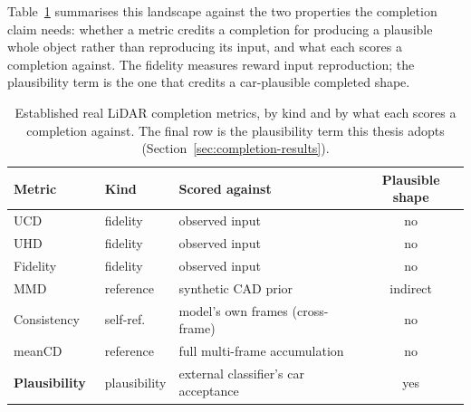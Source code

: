 \documentclass[a4paper,12pt]{report}
\begin{document}
Table~\ref{tab:completion-metrics} summarises this landscape against the two properties
the completion claim needs: whether a metric credits a completion for producing a
plausible whole object rather than reproducing its input, and what each scores a
completion against. The fidelity measures reward input reproduction; the plausibility
term is the one that credits a car-plausible completed shape.

\begin{table}[H]
  \centering
  \caption[Real LiDAR completion metrics by type]{Established real LiDAR completion
    metrics, by kind and by what each scores a completion against. The final row is the
    plausibility term this thesis adopts (Section~\ref{sec:completion-results}).}
  \label{tab:completion-metrics}
  \small
  \renewcommand{\arraystretch}{1.2}
  \setlength{\tabcolsep}{6pt}
  \begin{tabular}{@{}p{2.6cm}p{2.4cm}p{4.4cm}c@{}}
    \toprule
    Metric & Kind & Scored against & Plausible shape \\
    \midrule
    UCD~\cite{cui2023p2c}       & fidelity & observed input & no \\
    UHD~\cite{chen2020unpaired} & fidelity & observed input & no \\
    Fidelity~\cite{yuan2019pcnpointcompletionnetwork} & fidelity & observed input & no \\
    MMD~\cite{yuan2019pcnpointcompletionnetwork} & reference & synthetic CAD prior & indirect \\
    Consistency~\cite{yuan2019pcnpointcompletionnetwork} & self-ref. & model's own frames (cross-frame) & no \\
    meanCD~\cite{ren2022selfsupervised} & reference & full multi-frame accumulation & no \\
    \midrule
    \textbf{Plausibility}~\cite{chen2020unpaired} & plausibility & external classifier's car acceptance & yes \\
    \bottomrule
  \end{tabular}
\end{table}
\end{document}
